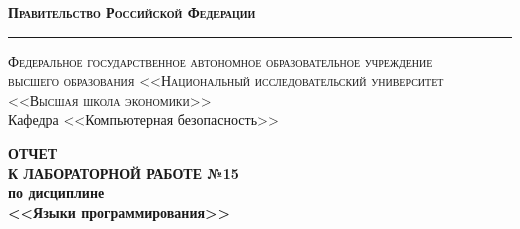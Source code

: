 \documentclass[a4paper, 12pt]{article}
\begin{document}
\begin{titlepage}

\begin{center}
{\textsc{\textbf{Правительство Российской Федерации}}}\\
\vspace{0.5cm}
\hrule
\vspace{0.5cm}
{\textsc{Федеральное государственное автономное образовательное учреждение\\высшего образования <<Национальный исследовательский университет\\<<Высшая школа экономики>>}}\\
\vspace{1cm}
Кафедра <<Компьютерная безопасность>>
\end{center}

\vspace{\fill}
\begin{center}
{\Large{\textbf{ОТЧЕТ \\ К ЛАБОРАТОРНОЙ РАБОТЕ №15}}} \\
\vspace{1em}
{\textbf{по дисциплине}} \\
\vspace{1em}
{\large{\textbf{<<Языки программирования>>}}}
\end{center}

\vspace{\fill}


\begin{flushright}
  \begin{minipage}[center]{15cm}


\end{minipage}
\end{flushright}
\end{titlepage}
\end{document}

